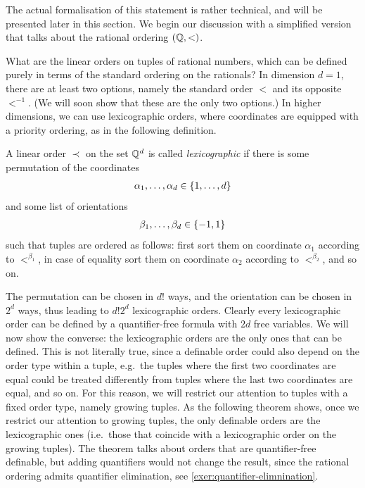 The actual formalisation of this statement is rather technical, and will be presented later in this section. We begin our discussion with a simplified  version that talks about the rational ordering $({\mathbb Q},<)$. 

What are the linear orders on tuples of rational numbers, which can be defined purely in terms of the standard ordering on the rationals?  In  dimension $d=1$, there are at least two options, namely the standard order $<$ and its opposite $<^{-1}$. (We will soon show that these are the only two options.) In higher dimensions, we can use  lexicographic orders, where coordinates are equipped with a priority ordering, as in the following definition. 

\begin{definition}
    \label{def:lexicographic-order}
    A linear order $\prec$ on the set ${\mathbb Q}^d$ is called \emph{lexicographic} if there is some permutation 
    of the coordinates
    \begin{align*}
    \alpha_1,\ldots,\alpha_d \in \{1,\ldots,d\}
    \end{align*}
    and  some list of   orientations
    \begin{align*}
    \beta_1,\ldots,\beta_d \in \{-1,1\}
    \end{align*}
    such that tuples are ordered as follows: first sort them on coordinate $\alpha_1$ according to $<^{\beta_1}$, in case of equality  sort them on coordinate $\alpha_2$ according to $<^{\beta_2}$, and so on. 
\end{definition}

The permutation can be chosen in $d!$  ways, and the orientation can be chosen in $2^d$ ways, thus leading to  $d! 2^d$ lexicographic orders. Clearly every lexicographic order can be defined by a quantifier-free formula with  $2d$ free variables. We will now show the converse: the lexicographic orders are the only ones that can be defined. This is not literally true, since a definable order could also depend on the order type within a tuple, e.g.~the tuples where the first two coordinates are equal could be treated differently from tuples where the last two coordinates are equal, and so on. For this reason, we will restrict our attention to tuples with a fixed order type, namely growing tuples. As the following theorem shows, once we restrict our attention to growing tuples, the only definable orders are the lexicographic ones (i.e.~those that coincide with a lexicographic order on the growing tuples). The theorem talks about orders that are quantifier-free definable, but adding quantifiers would not change the result, since the rational ordering admits quantifier elimination, see \cref{exer:quantifier-elimnination}.

